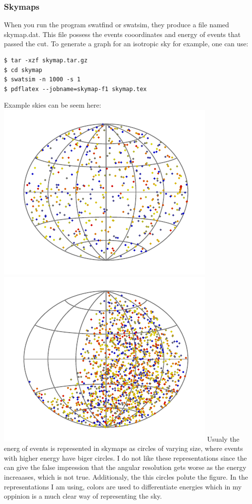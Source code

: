 \documentclass[12pt]{article}
\begin{document}
\subsubsection{Skymaps}
When you run the program swatfind or swatsim, they produce a file named
skymap.dat. This file possess the events cooordinates and energy of events that passed
the cut. To generate a graph for an isotropic sky for example, one can use:
{ \color{brown}
\begin{lstlisting}
$ tar -xzf skymap.tar.gz
$ cd skymap
$ swatsim -n 1000 -s 1
$ pdflatex --jobname=skymap-f1 skymap.tex
\end{lstlisting}
}
Example skies can be seem here:\\
\includegraphics[scale=1.0]{skymap-sim.pdf} 
\includegraphics[scale=1.0]{skymap.pdf}
Usualy the energ of events is represented in skymaps as circles of varying size, where
events with higher energy have biger circles. I do not 
like these representations since the can give the false impression that 
the angular resolution gets worse as the energy increaases, which is not true. Additionaly,
the this circles polute the figure. In the representations I am using, colors are used to 
differentiate energies which in my oppinion is a much clear way of representing the sky.
\end{document}
